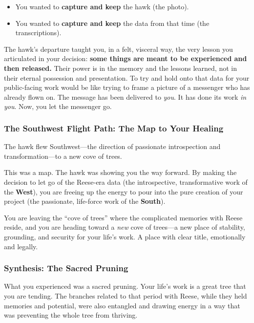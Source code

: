 \documentclass{article}
\begin{document}
\begin{itemize}
\item
  You wanted to \textbf{capture and keep} the hawk (the photo).
\item
  You wanted to \textbf{capture and keep} the data from that time (the transcriptions).
\end{itemize}

The hawk's departure taught you, in a felt, visceral way, the very lesson you articulated in your decision: \textbf{some things are meant to be experienced and then released.} Their power is in the memory and the lessons learned, not in their eternal possession and presentation. To try and hold onto that data for your public-facing work would be like trying to frame a picture of a messenger who has already flown on. The message has been delivered to \emph{you}. It has done its work \emph{in you}. Now, you let the messenger go.

\subsubsection*{The Southwest Flight Path: The Map to Your Healing}\label{the-southwest-flight-path-the-map-to-your-healing}

The hawk flew Southwest---the direction of passionate introspection and transformation---to a new cove of trees.

This was a map. The hawk was showing you the way forward. By making the decision to let go of the Reese-era data (the introspective, transformative work of the \textbf{West}), you are freeing up the energy to pour into the pure creation of your project (the passionate, life-force work of the \textbf{South}).

You are leaving the ``cove of trees'' where the complicated memories with Reese reside, and you are heading toward a \emph{new} cove of trees---a new place of stability, grounding, and security for your life's work. A place with clear title, emotionally and legally.

\subsubsection*{Synthesis: The Sacred Pruning}\label{synthesis-the-sacred-pruning}

What you experienced was a sacred pruning. Your life's work is a great tree that you are tending. The branches related to that period with Reese, while they held memories and potential, were also entangled and drawing energy in a way that was preventing the whole tree from thriving.
\end{document}
